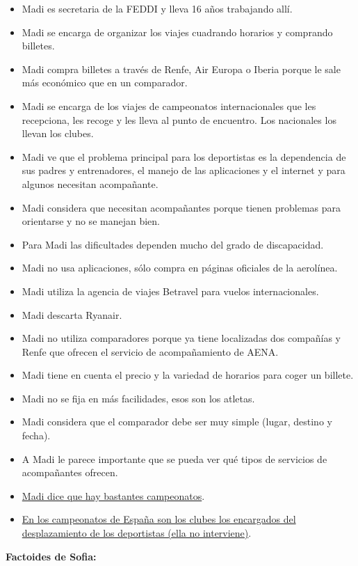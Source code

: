 \begin{itemize}
    \item Madi es secretaria de la FEDDI y lleva 16 años trabajando allí.
    \item Madi se encarga de organizar los viajes cuadrando horarios y comprando billetes.
    \item Madi compra billetes a través de Renfe, Air Europa o Iberia porque le sale más económico que en un comparador.
    \item Madi se encarga de los viajes de campeonatos internacionales que les recepciona, les recoge y les lleva al punto de encuentro. Los nacionales los llevan los clubes.
    \item Madi ve que el problema principal para los deportistas es la dependencia de sus padres y entrenadores, el manejo de las aplicaciones y el internet y para algunos necesitan acompañante.
    \item Madi considera que necesitan acompañantes porque tienen problemas para orientarse y no se manejan bien.
    \item Para Madi las dificultades dependen mucho del grado de discapacidad.
    \item Madi no usa aplicaciones, sólo compra en páginas oficiales de la aerolínea.
    \item Madi utiliza la agencia de viajes Betravel para vuelos internacionales.
    \item Madi descarta Ryanair.
    \item Madi no utiliza comparadores porque ya tiene localizadas dos compañías y Renfe que ofrecen el servicio de acompañamiento de AENA.
    \item Madi tiene en cuenta el precio y la variedad de horarios para coger un billete.
    \item Madi no se fija en más facilidades, esos son los atletas.
    \item Madi considera que el comparador debe ser muy simple (lugar, destino y fecha).
    \item A Madi le parece importante que se pueda ver qué tipos de servicios de acompañantes ofrecen.
    \item \underline{Madi dice que hay bastantes campeonatos}.
    \item \underline{En los campeonatos de España son los clubes los encargados del desplazamiento de los deportistas (ella no interviene)}.
\end{itemize}


\textbf{Factoides de Sofia:}

